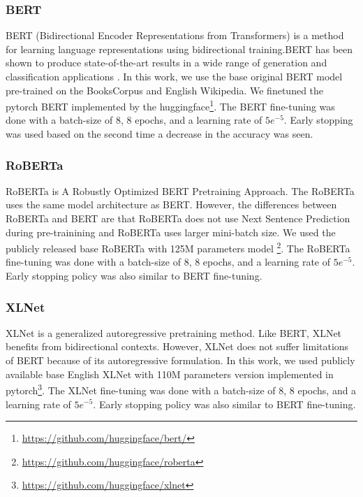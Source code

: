 \documentclass[11pt]{article}
\begin{document}
\subsubsection{BERT} 

BERT (Bidirectional Encoder Representations from Transformers) is a method for learning language representations using bidirectional training.BERT has been shown to produce state-of-the-art results in a wide range of generation and classification applications \cite{devlin2018bert}. In this work, we use the base original BERT model pre-trained on the BooksCorpus \cite{zhu2015aligning} and English Wikipedia. We finetuned the pytorch BERT implemented by the huggingface\footnote{\url{https://github.com/huggingface/bert/}}. The BERT fine-tuning was done with a batch-size of 8, 8 epochs, and a learning rate of $5e^{-5}$. Early stopping was used based on the second time a decrease in the accuracy was seen.

\subsubsection{RoBERTa}

RoBERTa is A Robustly Optimized BERT Pretraining Approach. The RoBERTa uses the same model architecture as BERT. However, the differences between RoBERTa and BERT are that RoBERTa does not use Next Sentence Prediction during pre-trainining and RoBERTa uses larger mini-batch size. We used the publicly released base RoBERTa with 125M parameters model \footnote{\url{https://github.com/huggingface/roberta}}. The RoBERTa fine-tuning was done with a batch-size of 8, 8 epochs, and a learning rate of $5e^{-5}$. Early stopping policy was also similar to BERT fine-tuning.

\subsubsection{XLNet}

XLNet is a generalized autoregressive pretraining method. Like BERT, XLNet benefits from bidirectional contexts. However, XLNet does not suffer limitations of BERT because of its autoregressive formulation. In this work, we used publicly available base English XLNet with 110M parameters version implemented in pytorch\footnote{\url{https://github.com/huggingface/xlnet}}. The XLNet fine-tuning was done with a batch-size of 8, 8 epochs, and a learning rate of $5e^{-5}$. Early stopping policy was also similar to BERT fine-tuning.
\end{document}
